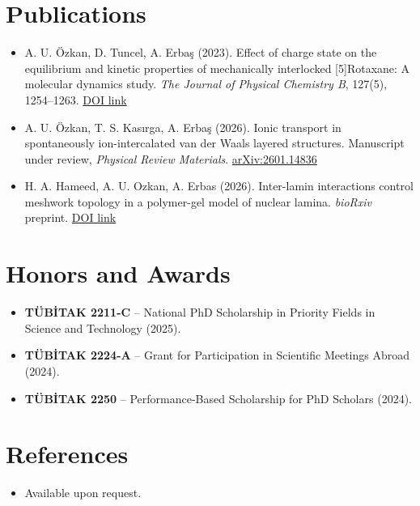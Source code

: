 \documentclass[11pt,a4paper,sans]{moderncv}
\begin{document}
\section{Publications}
\vspace{1pt}
\begin{itemize}
\item A. U. Özkan, D. Tuncel, A. Erbaş (2023). Effect of charge state on the equilibrium and kinetic properties of mechanically interlocked [5]Rotaxane: A molecular dynamics study. \textit{The Journal of Physical Chemistry B}, 127(5), 1254--1263. \href{https://doi.org/10.1021/acs.jpcb.2c07645}{DOI link}
\item A. U. Özkan, T. S. Kasırga, A. Erbaş (2026). Ionic transport in spontaneously ion-intercalated van der Waals layered structures. Manuscript under review, \textit{Physical Review Materials}. \href{https://arxiv.org/abs/2601.14836}{arXiv:2601.14836}
\item H. A. Hameed, A. U. Ozkan, A. Erbas (2026). Inter-lamin interactions control meshwork topology in a polymer-gel model of nuclear lamina. \textit{bioRxiv} preprint. \href{https://doi.org/10.64898/2026.03.14.711786}{DOI link}
\end{itemize}


\section{Honors and Awards}
\vspace{1pt}
\begin{itemize}
\item{\textbf{TÜBİTAK 2211-C} -- National PhD Scholarship in Priority Fields in Science and Technology (2025).}
\item{\textbf{TÜBİTAK 2224-A} -- Grant for Participation in Scientific Meetings Abroad (2024).}
\item{\textbf{TÜBİTAK 2250} -- Performance-Based Scholarship for PhD Scholars (2024).}
\end{itemize}


\section{References}
\vspace{1pt}
\begin{itemize}
\item{Available upon request.}
\end{itemize}
\end{document}
